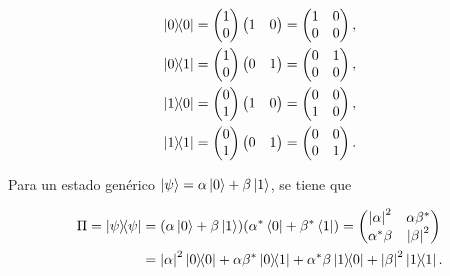 \begin{align*}
    \ketbra{0}{0} &= \begin{pmatrix} 1 \\ 0 \end{pmatrix} \begin{pmatrix} 1 & 0 \end{pmatrix} = \begin{pmatrix} 1 & 0 \\ 0 & 0 \end{pmatrix}, \\
    \ketbra{0}{1} &= \begin{pmatrix} 1 \\ 0 \end{pmatrix} \begin{pmatrix} 0 & 1 \end{pmatrix} = \begin{pmatrix} 0 & 1 \\ 0 & 0 \end{pmatrix}, \\
    \ketbra{1}{0} &= \begin{pmatrix} 0 \\ 1 \end{pmatrix} \begin{pmatrix} 1 & 0 \end{pmatrix} = \begin{pmatrix} 0 & 0 \\ 1 & 0 \end{pmatrix}, \\
    \ketbra{1}{1} &= \begin{pmatrix} 0 \\ 1 \end{pmatrix} \begin{pmatrix} 0 & 1 \end{pmatrix} = \begin{pmatrix} 0 & 0 \\ 0 & 1 \end{pmatrix}.
\end{align*}

Para un estado genérico $\ket{\psi} = \alpha\ket{0} + \beta\ket{1}$, se tiene que

\begin{align*}
    \Pi = \ketbra{\psi}{\psi} &= (\alpha \ket{0} + \beta \ket{1})(\alpha^* \bra{0} + \beta^* \bra{1}) = \begin{pmatrix} \abs{\alpha}^2 & \alpha \beta^* \\ \alpha^* \beta & \abs{\beta}^2 \end{pmatrix} \\
                        &= \abs{\alpha}^2 \ketbra{0} + \alpha\beta^* \ketbra{0}{1} + \alpha^* \beta \ketbra{1}{0} + \abs{\beta}^2 \ketbra{1} .
\end{align*}

